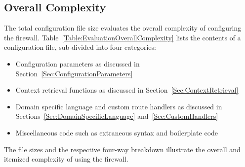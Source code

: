 \subsection{Overall Complexity}

The total configuration file size evaluates the overall complexity of configuring the firewall. Table~\ref{Table:EvaluationOverallComplexity} lists the contents of a configuration file, sub-divided into four categories:

\begin{itemize}[nosep]

\item Configuration parameters as discussed in Section~\ref{Sec:ConfigurationParameters}

\item Context retrieval functions as discussed in Section~\ref{Sec:ContextRetrieval}

\item Domain specific language and custom route handlers as discussed in Sections~\ref{Sec:DomainSpecificLanguage} and~\ref{Sec:CustomHandlers}

\item Miscellaneous code such as extraneous syntax and boilerplate code

\end{itemize}

The file sizes and the respective four-way breakdown illustrate the overall and itemized complexity of using the firewall.
 

